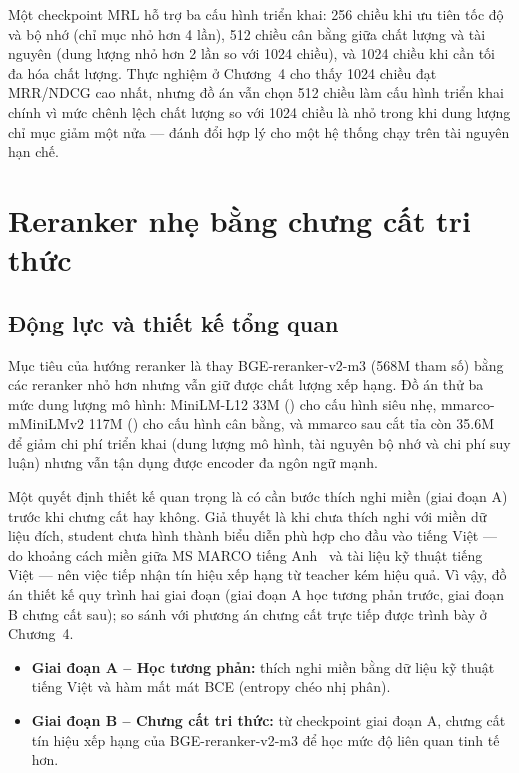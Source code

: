 \documentclass[../DoAn.tex]{subfiles}
\begin{document}
Một checkpoint MRL hỗ trợ ba cấu hình triển khai: 256 chiều khi ưu tiên tốc độ và bộ nhớ (chỉ mục nhỏ hơn 4 lần), 512 chiều cân bằng giữa chất lượng và tài nguyên (dung lượng nhỏ hơn 2 lần so với 1024 chiều), và 1024 chiều khi cần tối đa hóa chất lượng. Thực nghiệm ở Chương~4 cho thấy 1024 chiều đạt MRR/NDCG cao nhất, nhưng đồ án vẫn chọn 512 chiều làm cấu hình triển khai chính vì mức chênh lệch chất lượng so với 1024 chiều là nhỏ trong khi dung lượng chỉ mục giảm một nửa --- đánh đổi hợp lý cho một hệ thống chạy trên tài nguyên hạn chế.

\section{Reranker nhẹ bằng chưng cất tri thức}
\label{section:3.8}

\subsection{Động lực và thiết kế tổng quan}
\label{subsection:3.8.1}

Mục tiêu của hướng reranker là thay BGE-reranker-v2-m3 (568M tham số) bằng các reranker nhỏ hơn nhưng vẫn giữ được chất lượng xếp hạng. Đồ án thử ba mức dung lượng mô hình: MiniLM-L12 33M () cho cấu hình siêu nhẹ, mmarco-mMiniLMv2 117M () cho cấu hình cân bằng, và mmarco sau cắt tỉa còn 35.6M để giảm chi phí triển khai (dung lượng mô hình, tài nguyên bộ nhớ và chi phí suy luận) nhưng vẫn tận dụng được encoder đa ngôn ngữ mạnh.

Một quyết định thiết kế quan trọng là có cần bước thích nghi miền (giai đoạn A) trước khi chưng cất hay không. Giả thuyết là khi chưa thích nghi với miền dữ liệu đích, student chưa hình thành biểu diễn phù hợp cho đầu vào tiếng Việt --- do khoảng cách miền giữa MS MARCO tiếng Anh~\cite{nguyen2016msmarco} và tài liệu kỹ thuật tiếng Việt --- nên việc tiếp nhận tín hiệu xếp hạng từ teacher kém hiệu quả. Vì vậy, đồ án thiết kế quy trình hai giai đoạn (giai đoạn A học tương phản trước, giai đoạn B chưng cất sau); so sánh với phương án chưng cất trực tiếp được trình bày ở Chương~4.
\begin{itemize}
    \item \textbf{Giai đoạn A -- Học tương phản:} thích nghi miền bằng dữ liệu kỹ thuật tiếng Việt và hàm mất mát BCE (entropy chéo nhị phân).
    \item \textbf{Giai đoạn B -- Chưng cất tri thức:} từ checkpoint giai đoạn A, chưng cất tín hiệu xếp hạng của BGE-reranker-v2-m3 để học mức độ liên quan tinh tế hơn.
\end{itemize}
\end{document}
